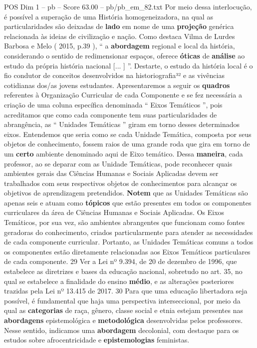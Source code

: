 \begin{textsample}{POS Dim 1 – pb – Score 63.00 – pb/pb\_em\_82.txt}
Por meio dessa interlocução, é possível a superação de uma História homogeneizadora, na qual as particularidades são deixadas de \textbf{lado} em nome de uma \textbf{projeção} genérica relacionada às ideias de civilização e nação.
Como destaca Vilma de Lurdes Barbosa e Melo ( 2015, p.39 ), “ a \textbf{abordagem} regional e local da história, considerando o sentido de redimensionar espaços, oferece \textbf{óticas} de \textbf{análise} ao estudo da própria história nacional [... ] ”.
Destarte, o estudo da história local é o fio condutor de conceitos desenvolvidos na historiografia³² e as vivências cotidianas dos/as jovens estudantes.
Apresentaremos a seguir os \textbf{quadros} referentes à Organização Curricular de cada Componente e se fez necessária a criação de uma coluna específica denominada “ Eixos Temáticos ”, pois acreditamos que como cada componente tem suas particularidades de abrangência, as “ Unidades Temáticas ” giram em torno desses determinados eixos.
Entendemos que seria como se cada Unidade Temática, composta por seus objetos de conhecimento, fossem raios de uma grande roda que gira em torno de um \textbf{certo} ambiente denominado aqui de Eixo temático.
Dessa \textbf{maneira}, cada professor, ao se deparar com as Unidade Temáticas, pode reconhecer quais ambientes gerais das Ciências Humanas e Sociais Aplicadas devem ser trabalhados com seus respectivos objetos de conhecimentos para alcançar os objetivos de aprendizagem pretendidos. \textbf{Notem} que as Unidades Temáticas são apenas seis e atuam como \textbf{tópicos} que estão presentes em todos os componentes curriculares da área de Ciências Humanas e Sociais Aplicadas.
Os Eixos Temáticos, por sua vez, são ambientes abrangentes que funcionam como fontes geradoras do conhecimento, criados particularmente para atender as necessidades de cada componente curricular.
Portanto, as Unidades Temáticas comuns a todos os componentes estão diretamente relacionadas aos Eixos Temáticos particulares de cada componente. 29 Ver a Lei nº 9.394, de 20 de dezembro de 1996, que estabelece as diretrizes e bases da educação nacional, sobretudo no art. 35, no qual se estabelece a finalidade do ensino \textbf{médio}, e as alterações posteriores trazidas pela Lei nº 13.415 de 2017. 30 Para que uma educação libertadora seja possível, é fundamental que haja uma perspectiva interseccional, por meio da qual as \textbf{categorias} de raça, gênero, classe social e etnia estejam presentes nas \textbf{abordagens} epistemológica e \textbf{metodológica} desenvolvidas pelos professores.
Nesse sentido, indicamos uma \textbf{abordagem} decolonial, com destaque para os estudos sobre afrocentricidade e \textbf{epistemologias} feministas.

\end{textsample}
